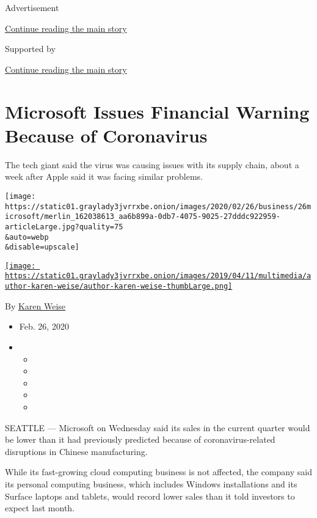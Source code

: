 Advertisement

\protect\hyperlink{after-top}{Continue reading the main story}

Supported by

\protect\hyperlink{after-sponsor}{Continue reading the main story}

\hypertarget{microsoft-issues-financial-warning-because-of-coronavirus}{%
\section{Microsoft Issues Financial Warning Because of
Coronavirus}\label{microsoft-issues-financial-warning-because-of-coronavirus}}

The tech giant said the virus was causing issues with its supply chain,
about a week after Apple said it was facing similar problems.

\texttt{[image: https://static01.graylady3jvrrxbe.onion/images/2020/02/26/business/26microsoft/merlin\_162038613\_aa6b899a-0db7-4075-9025-27dddc922959-articleLarge.jpg?quality=75\\\&auto=webp\\\&disable=upscale]}

\href{https://www.nytimes3xbfgragh.onion/by/karen-weise}{\texttt{[image: https://static01.graylady3jvrrxbe.onion/images/2019/04/11/multimedia/author-karen-weise/author-karen-weise-thumbLarge.png]}}

By \href{https://www.nytimes3xbfgragh.onion/by/karen-weise}{Karen Weise}

\begin{itemize}
\item
  Feb. 26, 2020
\item
  \begin{itemize}
  \item
  \item
  \item
  \item
  \item
  \end{itemize}
\end{itemize}

SEATTLE --- Microsoft on Wednesday said its sales in the current quarter
would be lower than it had previously predicted because of
coronavirus-related disruptions in Chinese manufacturing.

While its fast-growing cloud computing business is not affected, the
company said its personal computing business, which includes Windows
installations and its Surface laptops and tablets, would record lower
sales than it told investors to expect last month.

